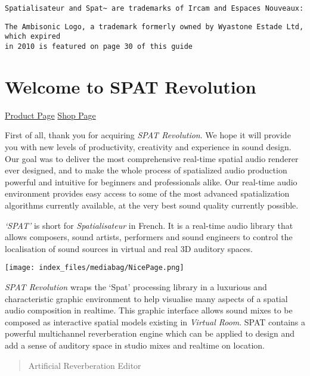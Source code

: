 \documentclass[
  letterpaper,
  DIV=11,
  numbers=noendperiod]{scrreport}
\begin{document}
\texttt{Spatialisateur\ and\ Spat\textasciitilde{}\ are\ trademarks\ of\ Ircam\ and\ Espaces\ Nouveaux:}

\begin{verbatim}
The Ambisonic Logo, a trademark formerly owned by Wyastone Estade Ltd, which expired
in 2010 is featured on page 30 of this guide
\end{verbatim}


\hypertarget{welcome-to-spat-revolution}{%
\chapter{Welcome to SPAT Revolution}\label{welcome-to-spat-revolution}}

\href{https://www.flux.audio/project/spat-revolution/}{Product Page}
\textbar{}
\href{https://shop.flux.audio/en_US/products/spat-revolution}{Shop Page}

First of all, thank you for acquiring \emph{SPAT Revolution}. We hope it
will provide you with new levels of productivity, creativity and
experience in sound design. Our goal was to deliver the most
comprehensive real-time spatial audio renderer ever designed, and to
make the whole process of spatialized audio production powerful and
intuitive for beginners and professionals alike. Our real-time audio
environment provides easy access to some of the most advanced
spatialization algorithms currently available, at the very best sound
quality currently possible.

\emph{`SPAT'} is short for \emph{Spatialisateur} in French. It is a
real-time audio library that allows composers, sound artists, performers
and sound engineers to control the localisation of sound sources in
virtual and real 3D auditory spaces.

\texttt{[image: index\_files/mediabag/NicePage.png]}

\emph{SPAT Revolution} wraps the `Spat' processing library in a
luxurious and characteristic graphic environment to help visualise many
aspects of a spatial audio composition in realtime. This graphic
interface allows sound mixes to be composed as interactive spatial
models existing in \emph{Virtual Room}. SPAT contains a powerful
multichannel reverberation engine which can be applied to design and add
a sense of auditory space in studio mixes and realtime on location.

\begin{quote}
Artificial Reverberation Editor
\end{quote}
\end{document}
